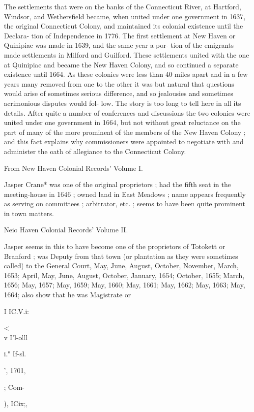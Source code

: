 \documentclass{book}
\begin{document}
The settlements that were on the banks of the Connecticut 
River, at Hartford, Windsor, and Wethersfield became, when 
united under one government in 1637, the original Connecticut 
Colony, and maintained its colonial existence until the Declara- 
tion of Independence in 1776. The first settlement at New 
Haven or Quinipiac was made in 1639, and the same year a por- 
tion of the emigrants made settlements in Milford and Guilford. 
These settlements united with the one at Quinipiac and became 
the New Haven Colony, and so continued a separate existence 
until 1664. As these colonies were less than 40 miles apart and 
in a few years many removed from one to the other it was but 
natural that questions would arise of sometimes serious difference, 
and so jealousies and sometimes acrimonious disputes would fol- 
low. The story is too long to tell here in all its details. After 
quite a number of conferences and discussions the two colonies 
were united under one government in 1664, but not without great 
reluctance on the part of many of the more prominent of the 
members of the New Haven Colony ; and this fact explains why 
commissioners were appointed to negotiate with and administer 
the oath of allegiance to the Connecticut Colony. 

From New Haven Colonial Records' Volume I. 

Jasper Crane* was one of the original proprietors ; had the 
fifth seat in the meeting-house in 1646 ; owned land in East 
Meadows ; name appears frequently as serving on committees ; 
arbitrator, etc. ; seems to have been quite prominent in town 
matters. 

Neio Haven Colonial Records' Volume II. 

Jasper seems in this to have become one of the proprietors of 
Totokett or Branford ; was Deputy from that town (or plantation 
as they were sometimes called) to the General Court, May, June, 
August, October, November, March, 1653; April, May, June, 
August, October, January, 1654; October, 1655; March, 1656; 
May, 1657; May, 1659; May, 1660; May, 1661; May, 1662; 
May, 1663; May, 1664; also show that he was Magistrate or 




I IC.V.i: 


<\\v I'l-olll 


i." If-sl. 


', 1701, 


; Com- 


), ICix;, 
\end{document}
